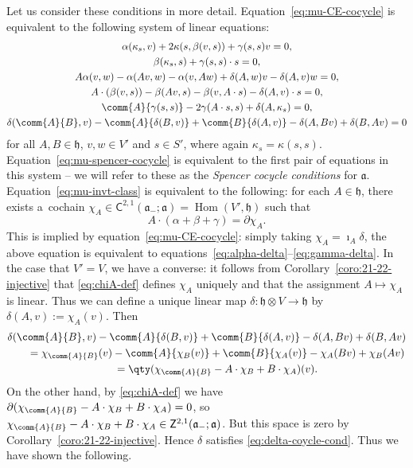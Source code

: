 \documentclass[10pt,a4paper]{amsart}
\numberwithin{equation}{section}
\newcommand{\fa}{\mathfrak{a}}
\newcommand{\fh}{\mathfrak{h}}
\newcommand{\ssC}{\mathsf{C}}
\newcommand{\ssZ}{\mathsf{Z}}
\newcommand{\1}{\mathbbm{1}}
\DeclareMathOperator{\Hom}{Hom}
\begin{document}
Let us consider these conditions in more detail. Equation~\eqref{eq:mu-CE-cocycle} is equivalent to the following system of linear equations:
\begin{gather}
	\alpha(\kappa_s,v) + 2\kappa(s,\beta(v,s)) + \gamma(s,s)v = 0,\label{eq:22-spencer-cocycle-vss} \\
	\beta(\kappa_s,s) + \gamma(s,s)\cdot s = 0,\label{eq:22-spencer-cocycle-sss}	\\
	A\alpha(v,w) - \alpha(Av,w) - \alpha(v,Aw) + \delta(A,w)v - \delta(A,v)w = 0,\label{eq:alpha-delta} \\
	A\cdot(\beta(v,s)) - \beta(Av,s) - \beta(v,A\cdot s) - \delta(A,v)\cdot s = 0,\label{eq:beta-delta} \\
	\comm{A}{\gamma(s,s)} - 2\gamma(A\cdot s,s) + \delta(A,\kappa_s) = 0,\label{eq:gamma-delta} \\
	\delta(\comm{A}{B},v) - \comm{A}{\delta(B,v)} + \comm{B}{\delta(A,v)} - \delta(A,Bv) + \delta(B,Av) = 0 \label{eq:delta-coycle-cond}
\end{gather}
for all $A,B\in\fh$, $v,w\in V'$ and $s\in S'$, where again $\kappa_s=\kappa(s,s)$. Equation~\eqref{eq:mu-spencer-cocycle} is equivalent to the first pair of equations in this system -- we will refer to these as the \emph{Spencer cocycle conditions} for $\fa$. Equation~\eqref{eq:mu-invt-class} is equivalent to the following: for each $A\in\fh$, there exists a~cochain $\chi_A\in \ssC^{2,1}(\fa_-;\fa)=\Hom(V',\fh)$ such that
\begin{equation}\label{eq:chiA-def}
	A\cdot(\alpha+\beta+\gamma) = \partial\chi_A.
\end{equation}
This is implied by equation~\eqref{eq:mu-CE-cocycle}: simply taking $\chi_A=\imath_A\delta$, the above equation is equivalent to equations~\eqref{eq:alpha-delta}--\eqref{eq:gamma-delta}. In the case that $V'=V$, we have a converse: it follows from Corollary~\ref{coro:21-22-injective} that \eqref{eq:chiA-def} defines $\chi_A$ uniquely and that the assignment $A\mapsto\chi_A$ is linear. Thus we can define a unique linear map $\delta\colon \fh\otimes V\to\fh$ by $\delta(A,v):=\chi_A(v)$. Then
\begin{gather*}
	\delta(\comm{A}{B},v) - \comm{A}{\delta(B,v)} + \comm{B}{\delta(A,v)} - \delta(A,Bv) + \delta(B,Av)\\
	\qquad= \chi_{\comm{A}{B}}(v) - \comm{A}{\chi_B(v)} + \comm{B}{\chi_A(v)}	- \chi_A(Bv) + \chi_B(Av)	\\
	\qquad= \qty(\chi_{\comm{A}{B}} - A\cdot\chi_B + B\cdot\chi_A)(v).
\end{gather*}
On the other hand, by \eqref{eq:chiA-def} we have
$\partial(\chi_{\comm{A}{B}} - A\cdot\chi_B + B\cdot\chi_A) = 0$,
so $\chi_{\comm{A}{B}} - A\cdot\chi_B + B\cdot\chi_A\in\ssZ^{2,1}(\fa_-;\fa)$. But this space is zero by Corollary~\ref{coro:21-22-injective}. Hence $\delta$ satisfies \eqref{eq:delta-coycle-cond}. Thus we have shown the following.
\end{document}

